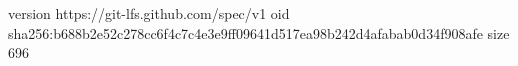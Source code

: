 version https://git-lfs.github.com/spec/v1
oid sha256:b688b2e52c278cc6f4c7c4e3e9ff09641d517ea98b242d4afabab0d34f908afe
size 696
